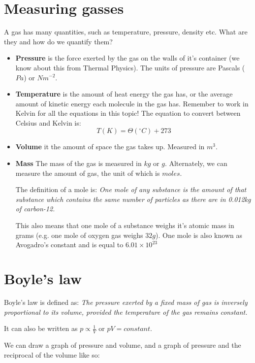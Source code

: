 \documentclass{article}
\begin{document}
\section*{Measuring gasses}
A gas has many quantities, such as temperature, pressure, density etc. What are
they and how do we quantify them?

\begin{itemize}
	\item \textbf{Pressure} is the force exerted by the gas on the walls of it's
	container (we know about this from Thermal Physics). The units of pressure
	are Pascals ($Pa$) or $Nm^{-2}$.
	\item \textbf{Temperature} is the amount of heat energy the gas has, or the
	average amount of kinetic energy each molecule in the gas has. Remember to
	work in Kelvin for all the equations in this topic! The equation to convert
	between Celsius and Kelvin is: 
	\[
		T(K) = \Theta(^\circ C) + 273
	\]
	\item \textbf{Volume} it the amount of space the gas takes up. Measured in
	$m^3$.
	\item \textbf{Mass} The mass of the gas is measured in $kg$ or $g$.
	Alternately, we can measure the amount of gas, the unit of which is $moles$.
	
	The definition of a mole is: \textit{One mole of any substance is the amount
	of that substance which contains the same number of particles as there are
	in 0.012kg of carbon-12.}
	
	This also means that one mole of a substance weighs it's atomic mass in
	grams (e.g. one mole of oxygen gas weighs $32g$). One mole is also known as
	Avogadro's constant and is equal to $6.01 \times 10^{23}$
\end{itemize}

\section*{Boyle's law}
Boyle's law is defined as: \textit{The pressure exerted by a fixed mass of gas
is inversely proportional to its volume, provided the temperature of the gas
remains constant.}

It can also be written as $p \propto \frac{1}{V}$ or $pV = constant$.

We can draw a graph of pressure and volume, and a graph of pressure and the
reciprocal of the volume like so:
\begin{center}
\end{center}
\end{document}

